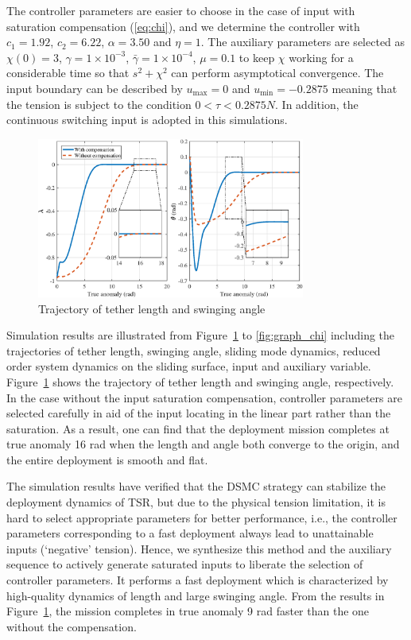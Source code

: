 \documentclass[10pt,final,journal]{IEEEtran}
\begin{document}
The controller parameters are easier to choose in the case of input with saturation compensation (\ref{eq:chi}), and we determine the controller with $c_1=1.92$, $c_2=6.22$, $\alpha=3.50$ and $\eta=1$. The auxiliary parameters are selected as $\chi(0) = 3$, $\gamma = 1\times 10^{-3}$, $\bar\gamma = 1\times 10^{-4}$, $\mu=0.1$ to keep $\chi$ working for a considerable time so that $s^2+\chi^2$ can perform asymptotical convergence. The input boundary can be described by $u_{\max} = 0$ and $u_{\min} = -0.2875$ meaning that the tension is subject to the condition $0<\tau<0.2875 N$.
In addition, the continuous switching input is adopted in this simulations.

\begin{figure}[htbp]
\centering
\includegraphics[width=250pt]{tether.eps}
\caption{Trajectory of tether length and swinging angle} \label{fig:graph_tether}
\end{figure}

Simulation results are illustrated from Figure~\ref{fig:graph_tether} to \ref{fig:graph_chi} including the trajectories of tether length, swinging angle, sliding mode dynamics, reduced order  system dynamics on the sliding surface, input and auxiliary variable. Figure~\ref{fig:graph_tether} shows the trajectory of tether length and swinging angle, respectively. In the case without the input saturation compensation, controller parameters are selected carefully in aid of the input locating in the linear part rather than the saturation. As a result, one can find that the deployment mission completes at true anomaly 16 rad when the length and angle both converge to the origin, and the entire deployment is smooth and flat. 

The simulation results have verified that the DSMC strategy can stabilize the deployment dynamics of TSR, but due to the physical tension limitation, it is hard to select appropriate parameters for better performance, i.e., the controller parameters corresponding to a fast deployment always lead to unattainable inputs (`negative' tension). Hence, we synthesize this method and the auxiliary sequence to actively generate saturated inputs to liberate the selection of controller parameters. It performs a fast deployment which is characterized by high-quality dynamics of length and large swinging angle. From the results in Figure~\ref{fig:graph_tether}, the mission completes in true anomaly 9 rad faster than the one without the compensation. 
\end{document}
